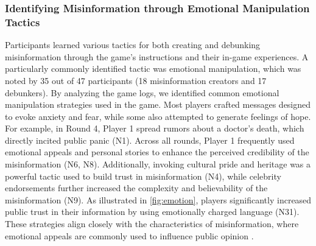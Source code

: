 \subsubsection{Identifying Misinformation through Emotional Manipulation Tactics}
Participants learned various tactics for both creating and debunking misinformation through the game’s instructions and their in-game experiences. A particularly commonly identified tactic was emotional manipulation, which was noted by 35 out of 47 participants (18 misinformation creators and 17 debunkers). By analyzing the game logs, we identified common emotional manipulation strategies used in the game. Most players crafted messages designed to evoke anxiety and fear, while some also attempted to generate feelings of hope. For example, in Round 4, Player 1 spread rumors about a doctor's death, which directly incited public panic (N1). Across all rounds, Player 1 frequently used emotional appeals and personal stories to enhance the perceived credibility of the misinformation (N6, N8). Additionally, invoking cultural pride and heritage was a powerful tactic used to build trust in misinformation (N4), while celebrity endorsements further increased the complexity and believability of the misinformation (N9). As illustrated in \autoref{fig:emotion}, players significantly increased public trust in their information by using emotionally charged language (N31). These strategies align closely with the characteristics of misinformation, where emotional appeals are commonly used to influence public opinion \cite{chuai2022really}. 

